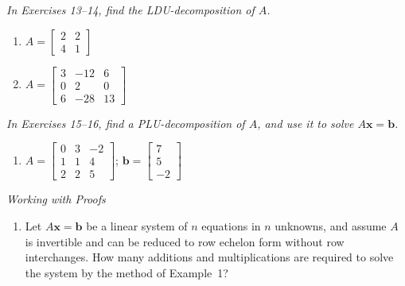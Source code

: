 \documentclass{article}
\begin{document}
\noindent\textit{In Exercises 13--14, find the LDU-decomposition of $A$.}

\begin{enumerate}
  \item[13.] $A = \begin{bmatrix}2&2\\4&1\end{bmatrix}$

  \item[14.] $A = \begin{bmatrix}3&-12&6\\0&2&0\\6&-28&13\end{bmatrix}$

\end{enumerate}

\noindent\textit{In Exercises 15--16, find a PLU-decomposition of $A$, and use it to
solve $A\mathbf{x}=\mathbf{b}$.}

\begin{enumerate}
  \item[16.] $A = \begin{bmatrix}0&3&-2\\1&1&4\\2&2&5\end{bmatrix}$;\quad
        $\mathbf{b} = \begin{bmatrix}7\\5\\-2\end{bmatrix}$

\end{enumerate}

\noindent\textit{Working with Proofs}

\begin{enumerate}
  \item[17.] Let $A\mathbf{x}=\mathbf{b}$ be a linear system of $n$ equations in $n$
        unknowns, and assume $A$ is invertible and can be reduced to row echelon form
        without row interchanges. How many additions and multiplications are required to
        solve the system by the method of Example~1?

\end{enumerate}
\end{document}
